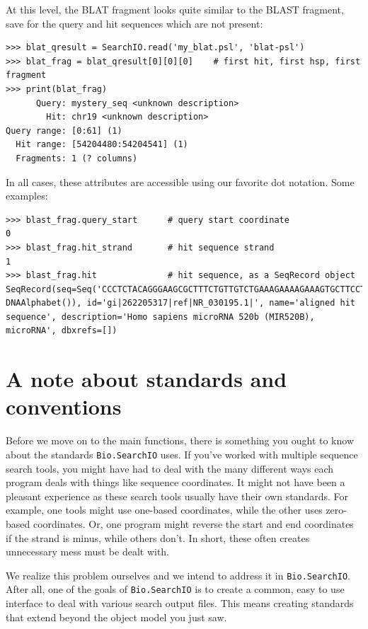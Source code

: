 \documentclass{report}
\begin{document}
At this level, the BLAT fragment looks quite similar to the BLAST fragment, save
for the query and hit sequences which are not present:

\begin{verbatim}
>>> blat_qresult = SearchIO.read('my_blat.psl', 'blat-psl')
>>> blat_frag = blat_qresult[0][0][0]    # first hit, first hsp, first fragment
>>> print(blat_frag)
      Query: mystery_seq <unknown description>
        Hit: chr19 <unknown description>
Query range: [0:61] (1)
  Hit range: [54204480:54204541] (1)
  Fragments: 1 (? columns)
\end{verbatim}

In all cases, these attributes are accessible using our favorite dot notation.
Some examples:

\begin{verbatim}
>>> blast_frag.query_start      # query start coordinate
0
>>> blast_frag.hit_strand       # hit sequence strand
1
>>> blast_frag.hit              # hit sequence, as a SeqRecord object
SeqRecord(seq=Seq('CCCTCTACAGGGAAGCGCTTTCTGTTGTCTGAAAGAAAAGAAAGTGCTTCCTTT...GGG', DNAAlphabet()), id='gi|262205317|ref|NR_030195.1|', name='aligned hit sequence', description='Homo sapiens microRNA 520b (MIR520B), microRNA', dbxrefs=[])
\end{verbatim}

\section{A note about standards and conventions}
\label{sec:searchio-standards}

Before we move on to the main functions, there is something you ought to know
about the standards \verb|Bio.SearchIO| uses. If you've worked with multiple
sequence search tools, you might have had to deal with the many different ways
each program deals with things like sequence coordinates. It might not have been
a pleasant experience as these search tools usually have their own standards.
For example, one tools might use one-based coordinates, while the other uses
zero-based coordinates. Or, one program might reverse the start and end
coordinates if the strand is minus, while others don't. In short, these often
creates unnecessary mess must be dealt with.

We realize this problem ourselves and we intend to address it in
\verb|Bio.SearchIO|. After all, one of the goals of \verb|Bio.SearchIO| is to
create a common, easy to use interface to deal with various search output files.
This means creating standards that extend beyond the object model you just saw.
\end{document}
